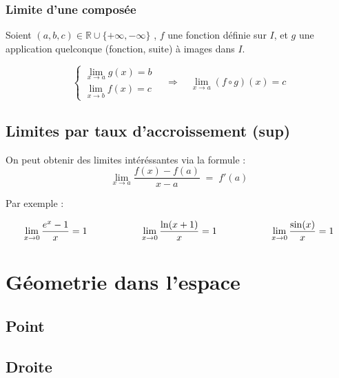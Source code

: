 \documentclass{report}
\newcommand{\R}{\mathbb{R}}
\begin{document}
      \subsubsection{Limite d'une composée}

      Soient $(a,b,c) \in \R \cup \{+\infty, -\infty\}$ , $f$ une fonction définie sur $I$, et $g$ une application quelconque (fonction, suite) à images dans $I$.

        \[\left\{\begin{array}{c}
          \displaystyle \lim_{x\to a} g(x) = b \\
          \displaystyle \lim_{x\to b} f(x) = c
        \end{array}\right.
        \quad \Rightarrow \quad
        \lim_{x\to a } (f \circ g)(x) =  c\]

    \subsection{Limites par taux d'accroissement (sup)}

    On peut obtenir des limites intéréssantes via la formule : 
    \[\lim_{x\to a} \frac{f(x) - f(a)}{x-a} \; = \; f'(a)\]

    Par exemple : 

    \[
    \begin{array}{c@{\hspace{2cm}}c@{\hspace{2cm}}c}
    \displaystyle \lim_{x\to0} \frac{e^x-1}{x} = 1 & \displaystyle \lim_{x\to0} \frac{\ln(x+1)}{x} = 1 & \displaystyle \lim_{x\to0} \frac{\sin(x)}{x} = 1
    \end{array}
    \]





    \newpage

    \iffalse\section{Géometrie dans l'espace}

    \subsection{Point}



    \subsection{Droite}
\end{document}
